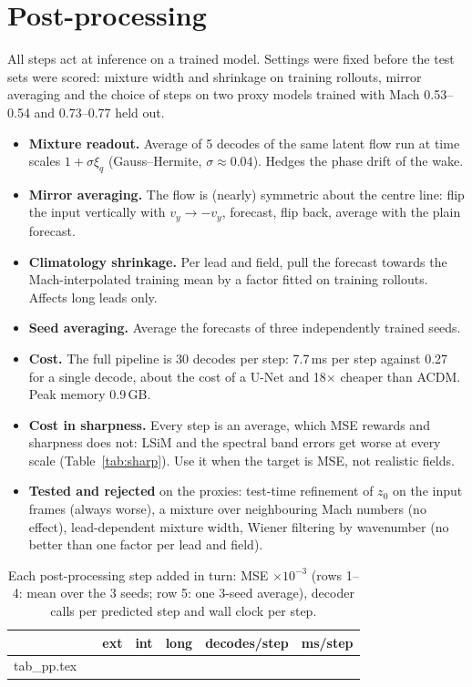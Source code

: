 \documentclass[10pt]{article}
\begin{document}
\section*{Post-processing}
All steps act at inference on a trained model. Settings were fixed before the test sets were
scored: mixture width and shrinkage on training rollouts, mirror averaging and the choice of steps
on two proxy models trained with Mach 0.53--0.54 and 0.73--0.77 held out.
\begin{itemize}\itemsep1pt
\item \textbf{Mixture readout.} Average of 5 decodes of the same latent flow run at time scales
  $1+\sigma\xi_q$ (Gauss--Hermite, $\sigma\approx0.04$). Hedges the phase drift of the wake.
\item \textbf{Mirror averaging.} The flow is (nearly) symmetric about the centre line: flip the
  input vertically with $v_y\to-v_y$, forecast, flip back, average with the plain forecast.
\item \textbf{Climatology shrinkage.} Per lead and field, pull the forecast towards the
  Mach-interpolated training mean by a factor fitted on training rollouts. Affects long leads only.
\item \textbf{Seed averaging.} Average the forecasts of three independently trained seeds.
\item \textbf{Cost.} The full pipeline is 30 decodes per step: 7.7\,ms per step against 0.27 for a
  single decode, about the cost of a U-Net and 18$\times$ cheaper than ACDM. Peak memory 0.9\,GB.
\item \textbf{Cost in sharpness.} Every step is an average, which MSE rewards and sharpness does
  not: LSiM and the spectral band errors get worse at every scale (Table~\ref{tab:sharp}). Use it
  when the target is MSE, not realistic fields.
\item \textbf{Tested and rejected} on the proxies: test-time refinement of $z_0$ on the input frames
  (always worse), a mixture over neighbouring Mach numbers (no effect), lead-dependent mixture width,
  Wiener filtering by wavenumber (no better than one factor per lead and field).
\end{itemize}

\begin{table}[!htbp]
\centering\scriptsize
\caption{Each post-processing step added in turn: MSE $\times10^{-3}$ (rows 1--4: mean over the 3
seeds; row 5: one 3-seed average), decoder calls per predicted step and wall clock per step.}
\label{tab:pp}
\begin{tabular}{llccccc}
\toprule
 & & ext & int & long & decodes/step & ms/step\\
\midrule
{} tab_pp.tex
\bottomrule
\end{tabular}
\end{table}
\end{document}
